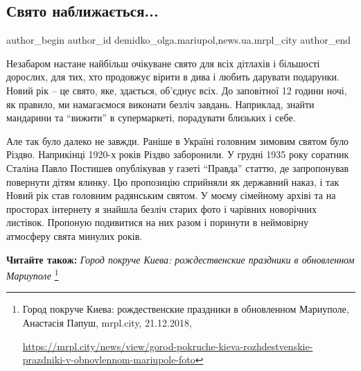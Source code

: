  
 
 
 
 
 
\subsection{Свято наближається...}
\label{sec:24_12_2018.stz.news.ua.mrpl_city.1.svjato_nablyzhajetsja}
 
\ifcmt
 author_begin
   author_id demidko_olga.mariupol,news.ua.mrpl_city
 author_end
\fi

Незабаром настане найбільш очікуване свято для всіх дітлахів і більшості
дорослих, для тих, хто продовжує вірити в дива і любить дарувати подарунки.
Новий рік – це свято, яке, здається, об'єднує всіх. До заповітної 12 години
ночі, як правило, ми намагаємося виконати безліч завдань. Наприклад, знайти
мандарини та \enquote{вижити} в супермаркеті, порадувати близьких і себе.


Але так було далеко не завжди. Раніше в Україні головним зимовим святом було
Різдво. Наприкінці 1920-х років Різдво заборонили. У грудні 1935 року соратник
Сталіна Павло Постишев опублікував у газеті \enquote{Правда} статтю, де
запропонував повернути дітям ялинку. Цю пропозицію сприйняли як державний
наказ, і так Новий рік став головним радянським святом. У моєму сімейному
архіві та на просторах інтернету я знайшла безліч старих фото і чарівних
новорічних листівок. Пропоную подивитися на них разом і поринути в неймовірну
атмосферу свята минулих років.


\textbf{Читайте також:} \emph{Город покруче Киева: рождественские праздники в обновленном Мариуполе}%
\footnote{Город покруче Киева: рождественские праздники в обновленном Мариуполе, Анастасія Папуш, mrpl.city, 21.12.2018,\par%
\url{https://mrpl.city/news/view/gorod-pokruche-kieva-rozhdestvenskie-prazdniki-v-obnovlennom-mariupole-foto}
}

